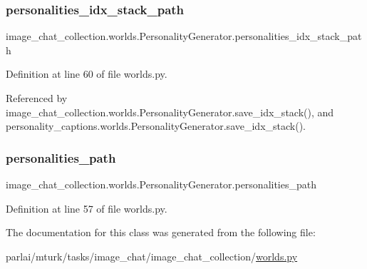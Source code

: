 \subsubsection{\texorpdfstring{personalities\+\_\+idx\+\_\+stack\+\_\+path}{personalities\_idx\_stack\_path}}
{\footnotesize\ttfamily image\+\_\+chat\+\_\+collection.\+worlds.\+Personality\+Generator.\+personalities\+\_\+idx\+\_\+stack\+\_\+path}



Definition at line 60 of file worlds.\+py.



Referenced by image\+\_\+chat\+\_\+collection.\+worlds.\+Personality\+Generator.\+save\+\_\+idx\+\_\+stack(), and personality\+\_\+captions.\+worlds.\+Personality\+Generator.\+save\+\_\+idx\+\_\+stack().

\mbox{\label{classimage__chat__collection_1_1worlds_1_1PersonalityGenerator_a1d40759bb3feb63f32181b1b623437d2}} 
\subsubsection{\texorpdfstring{personalities\+\_\+path}{personalities\_path}}
{\footnotesize\ttfamily image\+\_\+chat\+\_\+collection.\+worlds.\+Personality\+Generator.\+personalities\+\_\+path}



Definition at line 57 of file worlds.\+py.



The documentation for this class was generated from the following file\+:\begin{DoxyCompactItemize}
\item 
parlai/mturk/tasks/image\+\_\+chat/image\+\_\+chat\+\_\+collection/\hyperlink{parlai_2mturk_2tasks_2image__chat_2image__chat__collection_2worlds_8py}{worlds.\+py}\end{DoxyCompactItemize}
